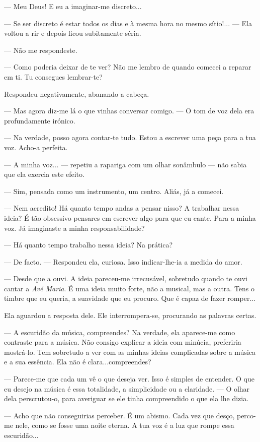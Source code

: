 --- Meu Deus! E eu a imaginar-me discreto...

--- Se ser discreto é estar todos os dias e à mesma hora no mesmo
sítio!... --- Ela voltou a rir e depois ficou subitamente séria.

--- Não me respondeste.

--- Como poderia deixar de te ver? Não me lembro de quando comecei a
reparar em ti. Tu consegues lembrar-te?

Respondeu negativamente, abanando a cabeça.

--- Mas agora diz-me lá o que vinhas conversar comigo. --- O tom de voz dela
era profundamente irónico.

--- Na verdade, posso agora contar-te tudo. Estou a escrever uma peça para
a tua voz. Acho-a perfeita.

--- A minha voz... --- repetiu a rapariga com um olhar sonâmbulo --- não sabia
que ela exercia este efeito.

--- Sim, pensada como um instrumento, um centro. Aliás, já a comecei.

--- Nem acredito! Há quanto tempo andas a pensar nisso? A trabalhar nessa
ideia? É tão obsessivo pensares em escrever algo para que eu cante. Para
a minha voz. Já imaginaste a minha responsabilidade?

--- Há quanto tempo trabalho nessa ideia? Na prática?

--- De facto. --- Respondeu ela, curiosa. Isso indicar-lhe-ia a medida do
amor.

--- Desde que a ouvi. A ideia pareceu-me irrecusável, sobretudo quando te
ouvi cantar a \emph{Avé Maria}. É uma ideia muito forte, não a musical,
mas a outra. Tens o timbre que eu queria, a suavidade que eu procuro.
Que é capaz de fazer romper...

Ela aguardou a resposta dele. Ele interrompera-se, procurando as
palavras certas.

--- A escuridão da música, compreendes? Na verdade, ela aparece-me como
contraste para a música. Não consigo explicar a ideia com minúcia,
preferiria mostrá-lo. Tem sobretudo a ver com as minhas ideias
complicadas sobre a música e a sua essência. Ela não é
clara...compreendes?

--- Parece-me que cada um vê o que deseja ver. Isso é simples de entender.
O que eu desejo na música é essa totalidade, a simplicidade ou a
claridade. --- O olhar dela perscrutou-o, para averiguar se ele tinha
compreendido o que ela lhe dizia.

--- Acho que não conseguirias perceber. É um abismo. Cada vez que desço,
perco-me nele, como se fosse uma noite eterna. A tua voz é a luz que
rompe essa escuridão...

